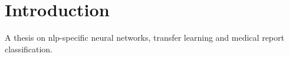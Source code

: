 \chapter{Introduction} \label{Introduction}
A thesis on nlp-specific neural networks, transfer learning and medical report classification.

